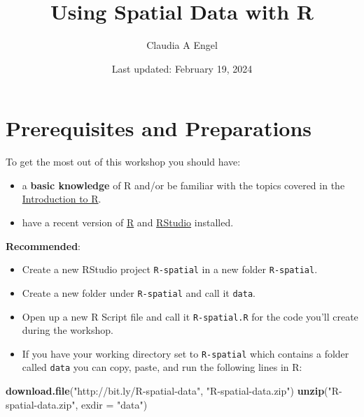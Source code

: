 \documentclass[
]{book}
\title{Using Spatial Data with R}
\author{Claudia A Engel}
\date{Last updated: February 19, 2024}
\newenvironment{Shaded}{\begin{snugshade}}{\end{snugshade}}
\newcommand{\AttributeTok}[1]{\textcolor[rgb]{0.13,0.29,0.53}{#1}}
\newcommand{\FunctionTok}[1]{\textcolor[rgb]{0.13,0.29,0.53}{\textbf{#1}}}
\newcommand{\NormalTok}[1]{#1}
\newcommand{\StringTok}[1]{\textcolor[rgb]{0.31,0.60,0.02}{#1}}
\providecommand{\tightlist}{%
  \setlength{\itemsep}{0pt}\setlength{\parskip}{0pt}}
\begin{document}
\maketitle

{
\setcounter{tocdepth}{1}
\tableofcontents
}
\hypertarget{prerequisites-and-preparations}{%
\chapter*{Prerequisites and Preparations}\label{prerequisites-and-preparations}}

To get the most out of this workshop you should have:

\begin{itemize}
\tightlist
\item
  a \textbf{basic knowledge} of R and/or be familiar with the topics covered in the \href{https://cengel.github.io/R-intro/}{Introduction to R}.
\item
  have a recent version of \href{https://cran.r-project.org/}{R} and \href{https://www.rstudio.com/}{RStudio} installed.
\end{itemize}

\textbf{Recommended}:

\begin{itemize}
\item
  Create a new RStudio project \texttt{R-spatial} in a new folder \texttt{R-spatial}.
\item
  Create a new folder under \texttt{R-spatial} and call it \texttt{data}.
\item
  Open up a new R Script file and call it \texttt{R-spatial.R} for the code you'll create during the workshop.
\item
  If you have your working directory set to \texttt{R-spatial} which contains a folder called \texttt{data} you can copy, paste, and run the following lines in R:
\end{itemize}

\begin{Shaded}
\begin{Highlighting}[]
\FunctionTok{download.file}\NormalTok{(}\StringTok{"http://bit.ly/R{-}spatial{-}data"}\NormalTok{, }\StringTok{"R{-}spatial{-}data.zip"}\NormalTok{)}
\FunctionTok{unzip}\NormalTok{(}\StringTok{"R{-}spatial{-}data.zip"}\NormalTok{, }\AttributeTok{exdir =} \StringTok{"data"}\NormalTok{)}
\end{Highlighting}
\end{Shaded}
\end{document}
